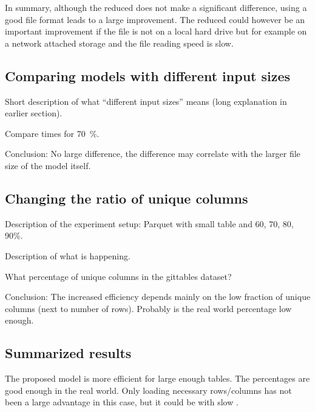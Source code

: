 In summary, although the reduced \io{} does not make a significant difference, using a good file format leads to a large improvement. The reduced \io{} could however be an important improvement if the file is not on a local hard drive but for example on a network attached storage and the file reading speed is slow. %



\subsection{Comparing models with different input sizes}\label{subsec:efficiency-comparing_models} %
Short description of what \enquote{different input sizes} means (long explanation in earlier section).

Compare times for \SI{70}{\percent}.

Conclusion: No large difference, the difference may correlate with the larger file size of the model itself.


\subsection{Changing the ratio of unique columns}\label{subsec:efficiency-changing_uniques} %
Description of the experiment setup: Parquet with small table and 60, 70, 80, 90\%.

Description of what is happening.

What percentage of unique columns in the gittables dataset?

Conclusion: The increased efficiency depends mainly on the low fraction of unique columns (next to number of rows). Probably is the real world percentage low enough.


\subsection{Summarized results}\label{subsec:efficiency-summarized_results} %
The proposed model is more efficient for large enough tables. The percentages are good enough in the real world. Only loading necessary rows/columns has not been a large advantage in this case, but it could be with slow \io{}.
